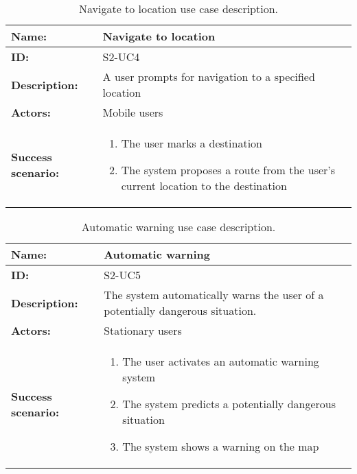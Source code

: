 \begin{table}[h!]
    \centering
    \begin{tabularx}{\textwidth}{|l|X|}
        \hline
        \textbf{Name:}  & Navigate to location \\ \hline
        \textbf{ID:}    & S2-UC4 \\ \hline
        \textbf{Description:} & A user prompts for navigation to a specified location \\ \hline
        \textbf{Actors:} & Mobile users \\ \hline
        \textbf{Success scenario:} & 
        \begin{enumerate}
            \item The user marks a destination
            \item The system proposes a route from the user's current location to the destination
        \end{enumerate}
        \\ \hline
    \end{tabularx}
    \caption{Navigate to location use case description.}
    \label{tab:s2-uc4}
\end{table}

\begin{table}[h!]
    \centering
    \begin{tabularx}{\textwidth}{|l|X|}
        \hline
        \textbf{Name:}  & Automatic warning \\ \hline
        \textbf{ID:}    & S2-UC5 \\ \hline
        \textbf{Description:} & The system automatically warns the user of a potentially dangerous situation. \\ \hline
        \textbf{Actors:} & Stationary users \\ \hline
        \textbf{Success scenario:} & 
        \begin{enumerate}
            \item The user activates an automatic warning system
            \item The system predicts a potentially dangerous situation
            \item The system shows a warning on the map
        \end{enumerate}
        \\ \hline
    \end{tabularx}
    \caption{Automatic warning use case description.}
    \label{tab:s2-uc5}
\end{table}


